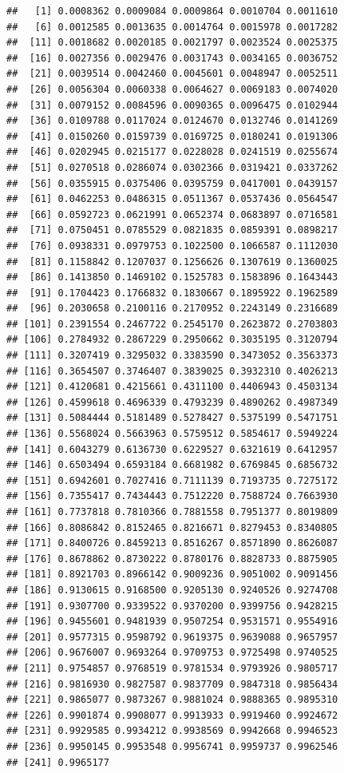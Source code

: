 \documentclass[10pt,]{krantz}
\begin{document}
\begin{verbatim}
##   [1] 0.0008362 0.0009084 0.0009864 0.0010704 0.0011610
##   [6] 0.0012585 0.0013635 0.0014764 0.0015978 0.0017282
##  [11] 0.0018682 0.0020185 0.0021797 0.0023524 0.0025375
##  [16] 0.0027356 0.0029476 0.0031743 0.0034165 0.0036752
##  [21] 0.0039514 0.0042460 0.0045601 0.0048947 0.0052511
##  [26] 0.0056304 0.0060338 0.0064627 0.0069183 0.0074020
##  [31] 0.0079152 0.0084596 0.0090365 0.0096475 0.0102944
##  [36] 0.0109788 0.0117024 0.0124670 0.0132746 0.0141269
##  [41] 0.0150260 0.0159739 0.0169725 0.0180241 0.0191306
##  [46] 0.0202945 0.0215177 0.0228028 0.0241519 0.0255674
##  [51] 0.0270518 0.0286074 0.0302366 0.0319421 0.0337262
##  [56] 0.0355915 0.0375406 0.0395759 0.0417001 0.0439157
##  [61] 0.0462253 0.0486315 0.0511367 0.0537436 0.0564547
##  [66] 0.0592723 0.0621991 0.0652374 0.0683897 0.0716581
##  [71] 0.0750451 0.0785529 0.0821835 0.0859391 0.0898217
##  [76] 0.0938331 0.0979753 0.1022500 0.1066587 0.1112030
##  [81] 0.1158842 0.1207037 0.1256626 0.1307619 0.1360025
##  [86] 0.1413850 0.1469102 0.1525783 0.1583896 0.1643443
##  [91] 0.1704423 0.1766832 0.1830667 0.1895922 0.1962589
##  [96] 0.2030658 0.2100116 0.2170952 0.2243149 0.2316689
## [101] 0.2391554 0.2467722 0.2545170 0.2623872 0.2703803
## [106] 0.2784932 0.2867229 0.2950662 0.3035195 0.3120794
## [111] 0.3207419 0.3295032 0.3383590 0.3473052 0.3563373
## [116] 0.3654507 0.3746407 0.3839025 0.3932310 0.4026213
## [121] 0.4120681 0.4215661 0.4311100 0.4406943 0.4503134
## [126] 0.4599618 0.4696339 0.4793239 0.4890262 0.4987349
## [131] 0.5084444 0.5181489 0.5278427 0.5375199 0.5471751
## [136] 0.5568024 0.5663963 0.5759512 0.5854617 0.5949224
## [141] 0.6043279 0.6136730 0.6229527 0.6321619 0.6412957
## [146] 0.6503494 0.6593184 0.6681982 0.6769845 0.6856732
## [151] 0.6942601 0.7027416 0.7111139 0.7193735 0.7275172
## [156] 0.7355417 0.7434443 0.7512220 0.7588724 0.7663930
## [161] 0.7737818 0.7810366 0.7881558 0.7951377 0.8019809
## [166] 0.8086842 0.8152465 0.8216671 0.8279453 0.8340805
## [171] 0.8400726 0.8459213 0.8516267 0.8571890 0.8626087
## [176] 0.8678862 0.8730222 0.8780176 0.8828733 0.8875905
## [181] 0.8921703 0.8966142 0.9009236 0.9051002 0.9091456
## [186] 0.9130615 0.9168500 0.9205130 0.9240526 0.9274708
## [191] 0.9307700 0.9339522 0.9370200 0.9399756 0.9428215
## [196] 0.9455601 0.9481939 0.9507254 0.9531571 0.9554916
## [201] 0.9577315 0.9598792 0.9619375 0.9639088 0.9657957
## [206] 0.9676007 0.9693264 0.9709753 0.9725498 0.9740525
## [211] 0.9754857 0.9768519 0.9781534 0.9793926 0.9805717
## [216] 0.9816930 0.9827587 0.9837709 0.9847318 0.9856434
## [221] 0.9865077 0.9873267 0.9881024 0.9888365 0.9895310
## [226] 0.9901874 0.9908077 0.9913933 0.9919460 0.9924672
## [231] 0.9929585 0.9934212 0.9938569 0.9942668 0.9946523
## [236] 0.9950145 0.9953548 0.9956741 0.9959737 0.9962546
## [241] 0.9965177
\end{verbatim}
\end{document}
